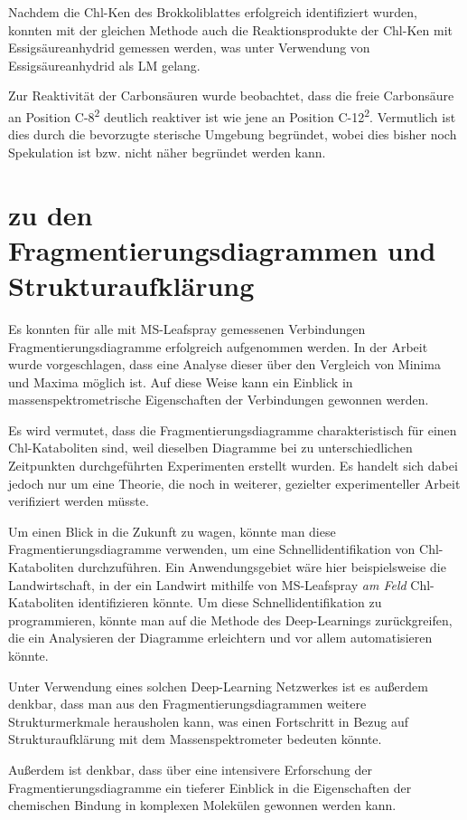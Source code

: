 Nachdem die \gls{Chl-K}en des Brokkoliblattes erfolgreich identifiziert wurden, konnten mit der gleichen Methode auch die Reaktionsprodukte der \gls{Chl-K}en mit Essigsäureanhydrid gemessen werden, was unter Verwendung von Essigsäureanhydrid als LM gelang.

Zur Reaktivität der Carbonsäuren wurde beobachtet, dass die freie Carbonsäure an Position C-8\textsuperscript{2} deutlich reaktiver ist wie jene an Position C-12\textsuperscript{2}. Vermutlich ist dies durch die bevorzugte sterische Umgebung begründet, wobei dies bisher noch Spekulation ist bzw. nicht näher begründet werden kann.

\section{zu den Fragmentierungsdiagrammen und Strukturaufklärung}

Es konnten für alle mit MS-Leafspray gemessenen Verbindungen Fragmentierungsdiagramme erfolgreich aufgenommen werden. In der Arbeit wurde vorgeschlagen, dass eine Analyse dieser über den Vergleich von Minima und Maxima möglich ist. Auf diese Weise kann ein Einblick in massenspektrometrische Eigenschaften der Verbindungen gewonnen werden. 

Es wird vermutet, dass die Fragmentierungsdiagramme charakteristisch für einen Chl-Kataboliten sind, weil dieselben Diagramme bei zu unterschiedlichen Zeitpunkten durchgeführten Experimenten erstellt wurden. Es handelt sich dabei jedoch nur um eine Theorie, die noch in weiterer, gezielter experimenteller Arbeit verifiziert werden müsste.

Um einen Blick in die Zukunft zu wagen, könnte man diese Fragmentierungsdiagramme verwenden, um eine Schnellidentifikation von Chl-Kataboliten durchzuführen. Ein Anwendungsgebiet wäre hier beispielsweise die Landwirtschaft, in der ein Landwirt mithilfe von MS-Leafspray \textit{am Feld} Chl-Kataboliten identifizieren könnte. Um diese Schnellidentifikation zu programmieren, könnte man auf die Methode des Deep-Learnings zurückgreifen, die ein Analysieren der Diagramme erleichtern und vor allem automatisieren könnte. 

Unter Verwendung eines solchen Deep-Learning Netzwerkes ist es außerdem denkbar, dass man aus den Fragmentierungsdiagrammen weitere Strukturmerkmale herausholen kann, was einen Fortschritt in Bezug auf Strukturaufklärung mit dem Massenspektrometer bedeuten könnte.

Außerdem ist denkbar, dass über eine intensivere Erforschung der Fragmentierungsdiagramme ein tieferer Einblick in die Eigenschaften der chemischen Bindung in komplexen Molekülen gewonnen werden kann.\\

